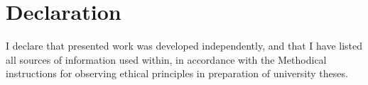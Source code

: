 

\section*{Declaration}
\vspace{2cm}
I declare that presented work was developed independently, and that I have listed all
sources of information used within, in accordance with the Methodical instructions for
observing ethical principles in preparation of university theses.





